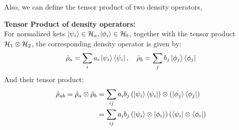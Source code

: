 Also, we can define the tensor product of two density operators, 
\begin{definition}{\textbf{Tensor Product of density operators:}}
    \\
    For normalized kets $\ket{\psi_i} \in \mathcal{H}_a, \ket{\phi_i} \in \mathcal{H}_b$, together with the tensor product $\mathcal{H}_1 \otimes \mathcal{H}_2$, the corresponding density operator is given by: 
    \begin{eqnarray}
        \hat{\rho}_a = \sum_i a_i \ket{\psi_i} \bra{\psi_i},\quad \hat{\rho}_b = \sum_j b_j \ket{\phi_j} \bra{\phi_j}
    \end{eqnarray}
    And their tensor product: 
    \begin{align}
        \hat{\rho}_{ab} = \hat{\rho}_a \otimes \hat{\rho}_b &= \sum_{ij} a_i b_j\left(\ket{\psi_i} \bra{\psi_i}\right) \otimes \left(\ket{\phi_j} \bra{\phi_j}\right) \notag\\
        &= \sum_{ij} a_i b_j \left(\ket{\psi_i} \otimes \ket{\phi_i}\right) \left(\bra{\psi_i} \otimes \bra{\phi_i}\right) \label{eq:tensor_density_operator}
    \end{align}
\end{definition}








